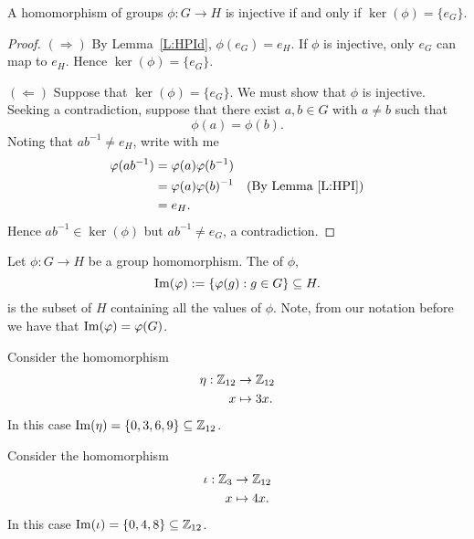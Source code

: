 \documentclass{ximera}
\begin{document}
\begin{lemma}\label{L:kerinj}
  A homomorphism of groups $\phi:G\to H$ is injective if and only if
  $\ker(\phi) = \{e_G\}$.
  \begin{proof}
    $(\Rightarrow)$ By Lemma~\ref{L:HPId}, $\phi(e_G) = e_H$. If
    $\phi$ is injective, only $e_G$ can map to $e_H$. Hence
    $\ker(\phi) = \{e_G\}$.


    $(\Leftarrow)$ Suppose that $\ker(\phi) = \{e_G\}$. We must show
    that $\phi$ is injective. Seeking a contradiction, suppose that
    there exist $a,b\in G$ with $a\ne b$ such that
    \[
    \phi(a) = \phi(b).
    \]
    Noting that $ab^{-1}\ne e_H$, write with me
    \begin{align*}
      \phi(ab^{-1}) &=\phi(a)\phi(b^{-1})\\
      &= \phi(a) \phi(b)^{-1} & \text{(By Lemma~\ref{L:HPI})}\\
      &= e_H.
    \end{align*}
    Hence $ab^{-1}\in\ker(\phi)$ but $ab^{-1}\ne e_G$, a
    contradiction.
  \end{proof}
\end{lemma}


\begin{definition}
  Let $\phi:G\to H$ be a group homomorphism. The  of
  $\phi$,
  \[
  \im(\phi) := \{\phi(g): g\in G\}\subset H.
  \]
  is the subset of $H$ containing all the values of $\phi$. Note, from
  our notation before we have that $\im(\phi) = \phi(G)$.
\end{definition}

\begin{example}
  Consider the homomorphism
  \begin{align*}
    \eta:\Z_{12} &\to \Z_{12}\\
    x &\mapsto 3x.
  \end{align*}
  In this case $\im(\eta) = \{0,3,6,9\}\subset \Z_{12}$.
\end{example}

\begin{example}\label{E:I1} 
  Consider the homomorphism
  \begin{align*}
    \iota:\Z_{3} &\to \Z_{12}\\
    x &\mapsto 4x.
  \end{align*}
  In this case $\im(\iota) = \{0,4,8\}\subset \Z_{12}$.
\end{example}
\end{document}
